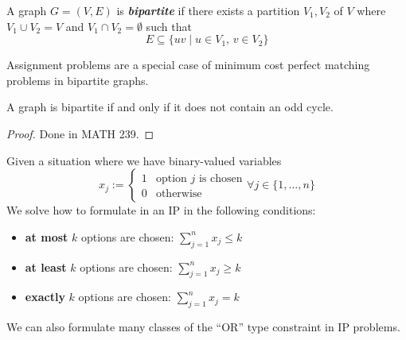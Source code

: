 \begin{defbox}
    \begin{definition}
        A graph $G=(V,E)$ is \textbf{\emph{bipartite}} if there exists a partition $V_1,V_2$
        of $V$ where $V_1\cup V_2=V$ and $V_1\cap V_2=\emptyset$ such that
        \[E\subseteq\{uv\mid u\in V_1,\, v\in V_2\}\]
    \end{definition}
\end{defbox}

Assignment problems are a special case of minimum cost perfect matching problems
in bipartite graphs.
\begin{thmbox}
    \begin{theorem}
        A graph is bipartite if and only if it does not contain an odd cycle.
    \end{theorem}
\end{thmbox}
\begin{proof}
    Done in MATH 239.
\end{proof}
Given a situation where we have binary-valued variables
\[x_j:=
    \begin{cases}
        1 & \text{option $j$ is chosen} \\
        0 & \text{otherwise}
    \end{cases}
    \forall j\in\{1,\dots,n\}
\]
We solve how to formulate in an IP in the following conditions:
\begin{itemize}
    \item \textbf{at most} $k$ options are chosen: $\displaystyle\sum\limits_{j=1}^n x_j\leqslant k$
    \item \textbf{at least} $k$ options are chosen: $\displaystyle\sum\limits_{j=1}^n x_j\geqslant  k$
    \item \textbf{exactly} $k$ options are chosen: $\displaystyle\sum\limits_{j=1}^n x_j=k$
\end{itemize}
We can also formulate many classes of the ``OR'' type constraint in IP problems.
